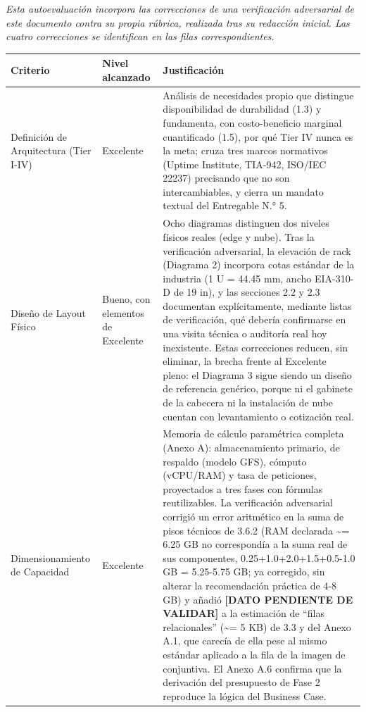 \documentclass[11pt,a4paper]{article}
\begin{document}
\emph{Esta autoevaluación incorpora las correcciones de una verificación adversarial de este documento contra su propia rúbrica, realizada tras su redacción inicial. Las cuatro correcciones se identifican en las filas correspondientes.}

{\small
\begin{longtable}[]{@{}
  >{\raggedright\arraybackslash}p{}
  >{\raggedright\arraybackslash}p{}
  >{\raggedright\arraybackslash}p{}@{}}
\toprule\noalign{}
\begin{minipage}[b]{\linewidth}\raggedright
Criterio
\end{minipage} & \begin{minipage}[b]{\linewidth}\raggedright
Nivel alcanzado
\end{minipage} & \begin{minipage}[b]{\linewidth}\raggedright
Justificación
\end{minipage} \\
\midrule\noalign{}
\endhead
\bottomrule\noalign{}
\endlastfoot
Definición de Arquitectura (Tier I-IV) & Excelente & Análisis de necesidades propio que distingue disponibilidad de durabilidad (1.3) y fundamenta, con costo-beneficio marginal cuantificado (1.5), por qué Tier IV nunca es la meta; cruza tres marcos normativos (Uptime Institute, TIA-942, ISO/IEC 22237) precisando que no son intercambiables, y cierra un mandato textual del Entregable N.° 5. \\
Diseño de Layout Físico & Bueno, con elementos de Excelente & Ocho diagramas distinguen dos niveles físicos reales (edge y nube). Tras la verificación adversarial, la elevación de rack (Diagrama 2) incorpora cotas estándar de la industria (1 U = 44.45 mm, ancho EIA-310-D de 19 in), y las secciones 2.2 y 2.3 documentan explícitamente, mediante listas de verificación, qué debería confirmarse en una visita técnica o auditoría real hoy inexistente. Estas correcciones reducen, sin eliminar, la brecha frente al Excelente pleno: el Diagrama 3 sigue siendo un diseño de referencia genérico, porque ni el gabinete de la cabecera ni la instalación de nube cuentan con levantamiento o cotización real. \\
Dimensionamiento de Capacidad & Excelente & Memoria de cálculo paramétrica completa (Anexo A): almacenamiento primario, de respaldo (modelo GFS), cómputo (vCPU/RAM) y tasa de peticiones, proyectados a tres fases con fórmulas reutilizables. La verificación adversarial corrigió un error aritmético en la suma de pisos técnicos de 3.6.2 (RAM declarada \textasciitilde= 6.25 GB no correspondía a la suma real de sus componentes, 0.25+1.0+2.0+1.5+0.5-1.0 GB = 5.25-5.75 GB; ya corregido, sin alterar la recomendación práctica de 4-8 GB) y añadió \textbf{{[}DATO PENDIENTE DE VALIDAR{]}} a la estimación de ``filas relacionales'' (\textasciitilde= 5 KB) de 3.3 y del Anexo A.1, que carecía de ella pese al mismo estándar aplicado a la fila de la imagen de conjuntiva. El Anexo A.6 confirma que la derivación del presupuesto de Fase 2 reproduce la lógica del Business Case. \\

\end{longtable}}
\end{document}
